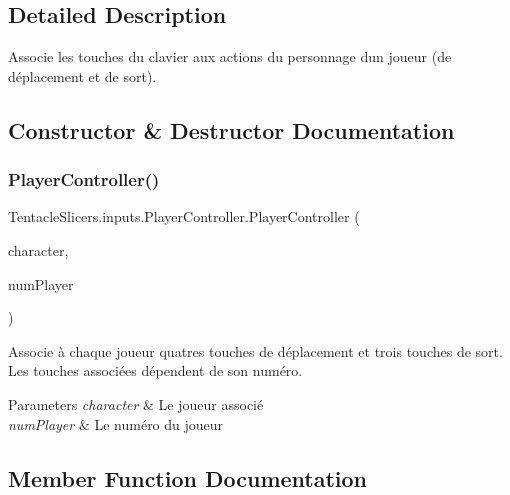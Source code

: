 \subsection{Detailed Description}
Associe les touches du clavier aux actions du personnage d\textquotesingle{}un joueur (de déplacement et de sort). 



\subsection{Constructor \& Destructor Documentation}
\mbox{\label{class_tentacle_slicers_1_1inputs_1_1_player_controller_ad39c39196dc661b2c486d078bc5e6663}} 
\subsubsection{\texorpdfstring{Player\+Controller()}{PlayerController()}}
{\footnotesize\ttfamily Tentacle\+Slicers.\+inputs.\+Player\+Controller.\+Player\+Controller (\begin{DoxyParamCaption}\item[{\hyperlink{class_tentacle_slicers_1_1actors_1_1_player_character}{Player\+Character}}]{character,  }\item[{int}]{num\+Player }\end{DoxyParamCaption})}



Associe à chaque joueur quatres touches de déplacement et trois touches de sort. Les touches associées dépendent de son numéro. 


\begin{DoxyParams}{Parameters}
{\em character} & Le joueur associé \\
\hline
{\em num\+Player} & Le numéro du joueur \\
\hline
\end{DoxyParams}


\subsection{Member Function Documentation}
\mbox{\label{class_tentacle_slicers_1_1inputs_1_1_player_controller_ade49d82ab4e91f4450ed1adc5ab7e0b3}} 
